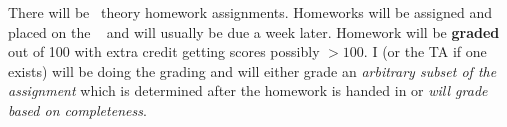 There will be \numtheoryhws~theory homework assignments. Homeworks will be assigned and placed on the \coursewebpagelink~ and will usually be due a week later. Homework will be \textbf{graded} out of 100 with extra credit getting scores possibly $> 100$. I (or the TA if one exists) will be doing the grading and will either grade an \textit{arbitrary subset of the assignment} which is determined after the homework is handed in or \textit{will grade based on completeness}. 

